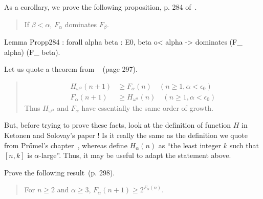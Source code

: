 \documentclass[a4paper]{book}
\begin{document}
As a corollary, we prove the following proposition, p. 284 of~\cite{KS81}.

\begin{quote}
  If $\beta<\alpha$, $F_\alpha$ dominates $F_\beta$.
\end{quote}

\begin{Coqsrc}
Lemma Propp284 : forall alpha beta : E0, 
   beta o< alpha -> dominates (F_ alpha) (F_ beta).
\end{Coqsrc}


\begin{exercise}
Let us quote a theorem from ~\cite{KS81} (page 297).

\begin{quote}
\begin{align*}
  H_{\omega^\alpha}(n+1) &\geq F_{\alpha}(n) \quad (n\geq 1, \alpha<\epsilon_0) \\
 F_{\alpha}(n+1) &\geq H_{\omega^\alpha}(n) \quad (n\geq 1, \alpha<\epsilon_0) 
\end{align*}
Thus $H_{\omega^\alpha}$ and $F_{\alpha}$ have essentially the same order of growth.

\end{quote}

 But, before trying to prove these facts, look at the definition of function $H$ in Ketonen and Solovay's paper ! Is it really the same as the definition we quote from Pr{\H o}mel's chapter~\cite{Promel2013},
whereas \cite{KS81} define $H_\alpha(n)$ as ``the least integer $k$ such that $[n,k]$ is $\alpha$-large''. Thus, it may be useful to adapt the statement above.



\end{exercise}


\begin{exercise}
Prove the following result~\cite{KS81}(p. 298).

\begin{quote}
   For $n\geq 2$ and $\alpha \geq 3$, $F_\alpha(n+1)\geq 2^{F_\alpha(n)}$.
\end{quote}
\end{exercise}



\end{document}

